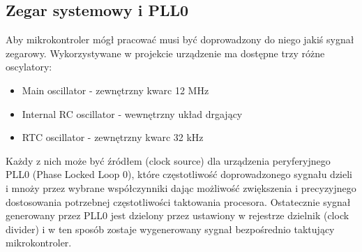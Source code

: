 \subsection{Zegar systemowy i PLL0} \label{system_clock}

Aby mikrokontroler mógł pracować musi być doprowadzony do niego jakiś sygnał zegarowy. Wykorzystywane w projekcie urządzenie ma dostępne trzy różne oscylatory:
\begin{itemize}
    \item Main oscillator - zewnętrzny kwarc 12 MHz
    \item Internal RC oscillator - wewnętrzny układ drgający
    \item RTC oscillator - zewnętrzny kwarc 32 kHz
\end{itemize}
Każdy z nich może być źródłem (clock source) dla urządzenia peryferyjnego PLL0 (Phase Locked Loop 0), które częstotliwość doprowadzonego sygnału dzieli i mnoży przez wybrane współczynniki dając możliwość zwiększenia i precyzyjnego dostosowania potrzebnej częstotliwości taktowania procesora. Ostatecznie sygnał generowany przez PLL0 jest dzielony przez ustawiony w rejestrze dzielnik (clock divider) i w ten sposób zostaje wygenerowany sygnał bezpośrednio taktujący mikrokontroler.

